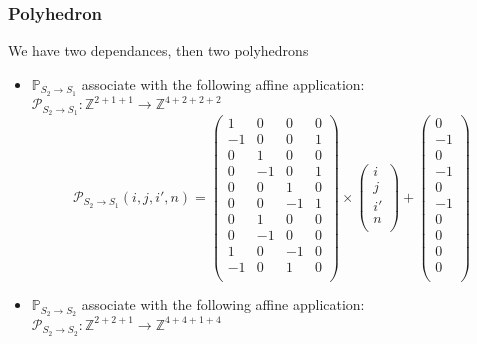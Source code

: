 			\subsubsection{Polyhedron}

We have two dependances, then two polyhedrons 
\begin{itemize}
	\item $\mathbb{P}_{S_{2} \rightarrow S_{1}}$ associate with the following affine application:\\
	$\mathcal{P}_{S_{2} \rightarrow S_{1}}: \mathbb{Z}^{2 + 1 + 1} \rightarrow  \mathbb{Z}^{4 + 2 + 2 + 2} $\\
	$$\mathcal{P}_{S_{2} \rightarrow S_{1}}(i, j, i', n) = 
	\begin{pmatrix}
		1  & 0  & 0  & 0 \\
		-1 & 0  & 0  & 1 \\
		0  & 1  & 0  & 0 \\
		0  & -1 & 0  & 1 \\
		0  & 0  & 1  & 0 \\
		0  & 0  & -1 & 1 \\
		0  & 1  & 0  & 0 \\
		0  & -1 & 0  & 0 \\
		1  & 0  & -1 & 0 \\
		-1 & 0  & 1  & 0 \\
	\end{pmatrix}
	\times
	\begin{pmatrix}
		i  \\
		j  \\
		i' \\
		n  \\
	\end{pmatrix}
	+
	\begin{pmatrix}
		0  \\
		-1 \\
		0  \\
		-1 \\
		0  \\
		-1 \\
		0  \\
		0  \\
		0  \\
		0  \\
	\end{pmatrix}$$
	\item $\mathbb{P}_{S_{2} \rightarrow S_{2}}$ associate with the following affine application:\\
	$\mathcal{P}_{S_{2} \rightarrow S_{2}}: \mathbb{Z}^{2 + 2 + 1} \rightarrow  \mathbb{Z}^{4 + 4 + 1 + 4} $\\

\end{itemize}
